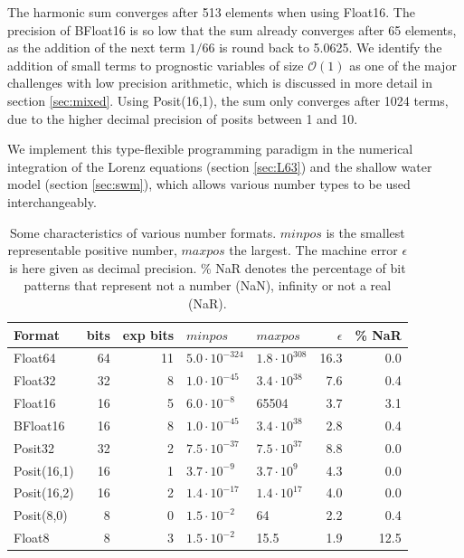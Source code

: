 \documentclass[draft]{agujournal2019}
\begin{document}
The harmonic sum converges after 513 elements when using Float16. The precision of BFloat16 is so low that the sum already converges after 65 elements, as the addition of the next term $1/66$ is round back to 5.0625. We identify the addition of small terms to prognostic variables of size $\mathcal{O}(1)$ as one of the major challenges with low precision arithmetic, which is discussed in more detail in section \ref{sec:mixed}. Using Posit(16,1), the sum only converges after 1024 terms, due to the higher decimal precision of posits between 1 and 10.

We implement this type-flexible programming paradigm in the numerical integration of the Lorenz equations (section \ref{sec:L63}) and the shallow water model (section \ref{sec:swm}), which allows various number types to be used interchangeably.

\begin{table}[htbp]
\center
\begin{tabular}{l | r | r | l | l | r | r}
Format & bits & exp bits & $minpos$ & $maxpos$ & $\epsilon$ &  \% NaR \\
\hline
Float64	& 64 & 11 & $5.0 \cdot 10^{-324}$ & $1.8 \cdot 10^{308}$  & 16.3 & 0.0 \\
Float32	& 32 & 8 & $1.0 \cdot 10^{-45}$ & $3.4 \cdot 10^{38}$ & 7.6 & 0.4 \\
Float16	& 16 & 5 & $6.0 \cdot 10^{-8}$ & 65504 & 3.7 & 3.1 \\
BFloat16	& 16 & 8 & $ 1.0 \cdot 10^{-45}$ & $3.4 \cdot 10^{38}$ & 2.8 & 0.4  \\
Posit32	& 32 & 2 &  $7.5 \cdot 10^{-37}$ & $7.5 \cdot 10^{37}$ & 8.8 & 0.0 \\
Posit(16,1) & 16 & 1 & $3.7 \cdot 10^{-9}$ & $3.7 \cdot 10^{9}$ & 4.3 & 0.0\\
Posit(16,2) & 16 & 2 & $1.4 \cdot 10^{-17}$ & $1.4 \cdot 10^{17}$ & 4.0 & 0.0\\
Posit(8,0) & 8 & 0 & $1.5 \cdot 10^{-2}$ & 64 & 2.2 & 0.4  \\
Float8 & 8 & 3 & $1.5 \cdot 10^{-2}$ & 15.5 & 1.9 &12.5\\
\end{tabular}
\vspace{10pt}
\caption{Some characteristics of various number formats. $minpos$ is the smallest representable positive number, $maxpos$ the largest. The machine error $\epsilon$ is here given as decimal precision. \% NaR denotes the percentage of bit patterns that represent not a number (NaN), infinity or not a real (NaR).}
\label{tab:formats}
\end{table}
\end{document}
